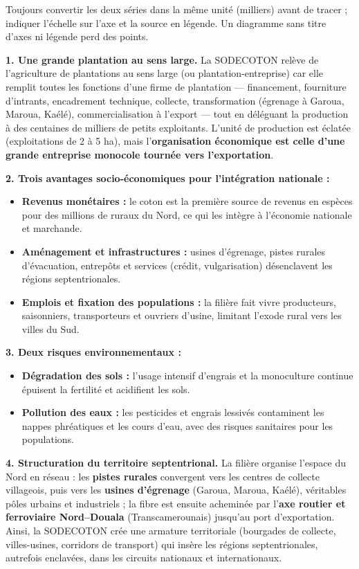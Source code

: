 \documentclass[11pt]{article}
\newcommand{\cle}[1]{{\popxbold\color{popdark}#1}}
\begin{document}
\begin{attention}
Toujours convertir les deux séries dans la même unité (milliers) avant de tracer ; indiquer l'échelle sur l'axe et la source en légende. Un diagramme sans titre d'axes ni légende perd des points.
\end{attention}

\begin{corrige}
\textbf{1. Une \og grande plantation \fg{} au sens large.} La SODECOTON relève de l'agriculture de plantations au sens large (ou \cle{plantation-entreprise}) car elle remplit toutes les fonctions d'une firme de plantation — financement, fourniture d'intrants, encadrement technique, collecte, transformation (égrenage à Garoua, Maroua, Kaélé), commercialisation à l'export — tout en déléguant la production à des centaines de milliers de petits exploitants. L'unité de production est éclatée (exploitations de 2 à 5 ha), mais l'\textbf{organisation économique est celle d'une grande entreprise monocole tournée vers l'exportation}.

\textbf{2. Trois avantages socio-économiques pour l'intégration nationale :}
\begin{itemize}
\item \textbf{Revenus monétaires :} le coton est la première source de revenus en espèces pour des millions de ruraux du Nord, ce qui les intègre à l'économie nationale et marchande.
\item \textbf{Aménagement et infrastructures :} usines d'égrenage, pistes rurales d'évacuation, entrepôts et services (crédit, vulgarisation) désenclavent les régions septentrionales.
\item \textbf{Emplois et fixation des populations :} la filière fait vivre producteurs, saisonniers, transporteurs et ouvriers d'usine, limitant l'exode rural vers les villes du Sud.
\end{itemize}

\textbf{3. Deux risques environnementaux :}
\begin{itemize}
\item \textbf{Dégradation des sols :} l'usage intensif d'engrais et la monoculture continue épuisent la fertilité et acidifient les sols.
\item \textbf{Pollution des eaux :} les pesticides et engrais lessivés contaminent les nappes phréatiques et les cours d'eau, avec des risques sanitaires pour les populations.
\end{itemize}

\textbf{4. Structuration du territoire septentrional.} La filière organise l'espace du Nord en réseau : les \textbf{pistes rurales} convergent vers les centres de collecte villageois, puis vers les \textbf{usines d'égrenage} (Garoua, Maroua, Kaélé), véritables pôles urbains et industriels ; la fibre est ensuite acheminée par l'\textbf{axe routier et ferroviaire Nord--Douala} (Transcamerounais) jusqu'au port d'exportation. Ainsi, la SODECOTON crée une armature territoriale (bourgades de collecte, villes-usines, corridors de transport) qui insère les régions septentrionales, autrefois enclavées, dans les circuits nationaux et internationaux.
\end{corrige}
\end{document}
